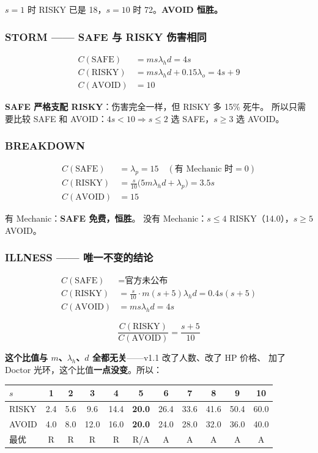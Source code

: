 \documentclass[UTF8,11pt,a4paper]{ctexart}
\begin{document}
$s=1$ 时 RISKY 已是 18，$s=10$ 时 72。\textbf{AVOID 恒胜。}

\subsubsection*{STORM —— SAFE 与 RISKY 伤害相同}

\begin{align*}
C(\text{SAFE})&=m s\lambda_h d=4s\\
C(\text{RISKY})&=m s\lambda_h d+0.15\lambda_o=4s+9\\
C(\text{AVOID})&=10
\end{align*}

\textbf{SAFE 严格支配 RISKY}：伤害完全一样，但 RISKY 多 15\% 死牛。
所以只需要比较 SAFE 和 AVOID：$4s<10\Rightarrow s\le2$ 选 SAFE，$s\ge3$ 选 AVOID。

\subsubsection*{BREAKDOWN}

\begin{align*}
C(\text{SAFE})&=\lambda_p=15\quad(\text{有 Mechanic 时}=0)\\
C(\text{RISKY})&=\tfrac{s}{10}\big(5m\lambda_h d+\lambda_p\big)=3.5s\\
C(\text{AVOID})&=15
\end{align*}

有 Mechanic：\textbf{SAFE 免费，恒胜}。
没有 Mechanic：$s\le4$ RISKY（14.0），$s\ge5$ AVOID。

\subsubsection*{ILLNESS —— 唯一不变的结论}\label{sec:illness}

\begin{align*}
C(\text{SAFE})&=\text{官方未公布}\\
C(\text{RISKY})&=\tfrac{s}{10}\cdot m(s+5)\lambda_h d=0.4s(s+5)\\
C(\text{AVOID})&=m s\lambda_h d=4s
\end{align*}

\[
\boxed{\frac{C(\text{RISKY})}{C(\text{AVOID})}=\frac{s+5}{10}}
\]

\textbf{这个比值与 $m$、$\lambda_h$、$d$ 全都无关}——v1.1 改了人数、改了 HP 价格、
加了 Doctor 光环，这个比值\textbf{一点没变}。所以：

\begin{center}
\begin{tabular}{@{}lcccccccccc@{}}
\toprule
$s$ & 1 & 2 & 3 & 4 & \textbf{5} & 6 & 7 & 8 & 9 & 10 \\
\midrule
RISKY & 2.4 & 5.6 & 9.6 & 14.4 & \textbf{20.0} & 26.4 & 33.6 & 41.6 & 50.4 & 60.0 \\
AVOID & 4.0 & 8.0 & 12.0 & 16.0 & \textbf{20.0} & 24.0 & 28.0 & 32.0 & 36.0 & 40.0 \\
\midrule
最优 & R & R & R & R & R/A & A & A & A & A & A \\
\bottomrule
\end{tabular}
\end{center}
\end{document}
